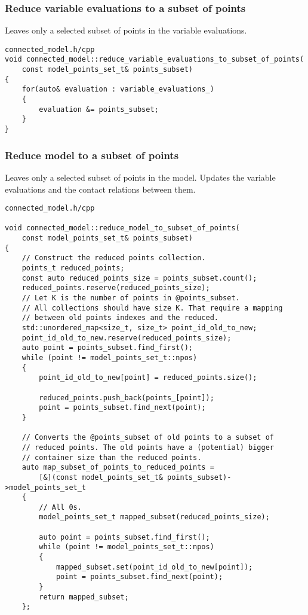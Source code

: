 \documentclass{article}
\begin{document}
	\subsubsection*{Reduce variable evaluations to a subset of points}
	Leaves only a selected subset of points in the variable evaluations.
\\
\begin{lstlisting}
connected_model.h/cpp
void connected_model::reduce_variable_evaluations_to_subset_of_points(
	const model_points_set_t& points_subset)
{
    for(auto& evaluation : variable_evaluations_)
    {
        evaluation &= points_subset;
    }
}
\end{lstlisting}

	\newpage
	\subsubsection*{Reduce model to a subset of points}
	Leaves only a selected subset of points in the model. Updates the variable evaluations and the contact relations between them.
\\
\begin{lstlisting}
connected_model.h/cpp

void connected_model::reduce_model_to_subset_of_points(
	const model_points_set_t& points_subset)
{
    // Construct the reduced points collection.
    points_t reduced_points;
    const auto reduced_points_size = points_subset.count();
    reduced_points.reserve(reduced_points_size);
    // Let K is the number of points in @points_subset.
    // All collections should have size K. That require a mapping
    // between old points indexes and the reduced.
    std::unordered_map<size_t, size_t> point_id_old_to_new;
    point_id_old_to_new.reserve(reduced_points_size);
    auto point = points_subset.find_first();
    while (point != model_points_set_t::npos)
    {
        point_id_old_to_new[point] = reduced_points.size();

        reduced_points.push_back(points_[point]);
        point = points_subset.find_next(point);
    }

    // Converts the @points_subset of old points to a subset of
    // reduced points. The old points have a (potential) bigger
    // container size than the reduced points.
    auto map_subset_of_points_to_reduced_points =
        [&](const model_points_set_t& points_subset)->model_points_set_t
    {
        // All 0s.
        model_points_set_t mapped_subset(reduced_points_size);

        auto point = points_subset.find_first();
        while (point != model_points_set_t::npos)
        {
            mapped_subset.set(point_id_old_to_new[point]);
            point = points_subset.find_next(point);
        }
        return mapped_subset;
    };
\end{lstlisting}
\end{document}

